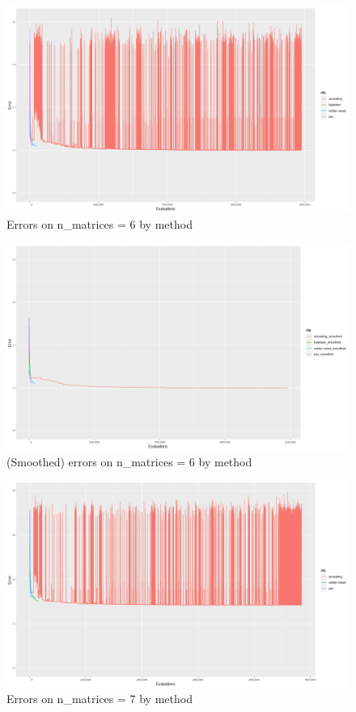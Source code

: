 \begin{figure}[!htb]
\centering
\includegraphics[width=\textwidth]{figures/n_6}
\decoRule
\caption[n=6]{Errors on n\_matrices = 6 by method}
\label{fig:n_6}
\end{figure}

\begin{figure}[!htb]
\centering
\includegraphics[width=\textwidth]{figures/n_6_smoothed}
\decoRule
\caption[n=6 (smoothed)]{(Smoothed) errors on n\_matrices = 6 by method}
\label{fig:n_6_smoothed}
\end{figure}

\begin{figure}[!htb]
\centering
\includegraphics[width=\textwidth]{figures/n_7}
\decoRule
\caption[n=7]{Errors on n\_matrices = 7 by method}
\label{fig:n_7}
\end{figure}

